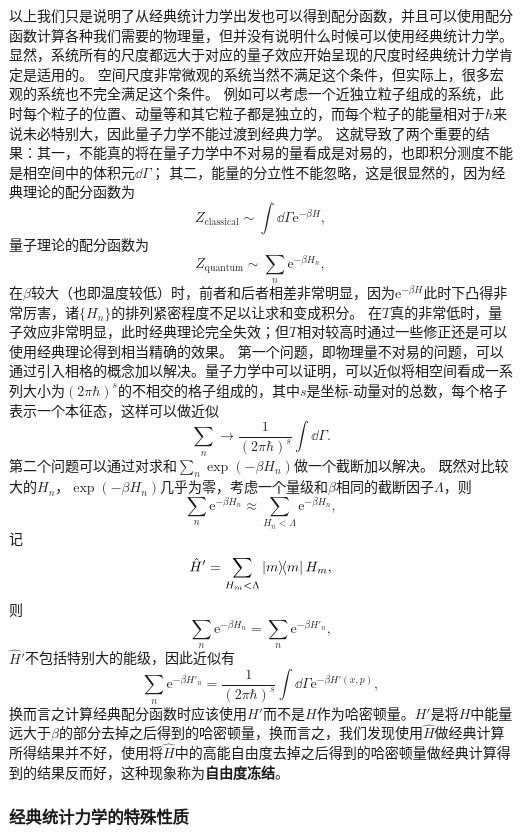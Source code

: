 \documentclass[hyperref, UTF8, a4paper]{ctexart}
\newcommand*{\ee}{\mathrm{e}}
\begin{document}
以上我们只是说明了从经典统计力学出发也可以得到配分函数，并且可以使用配分函数计算各种我们需要的物理量，但并没有说明什么时候可以使用经典统计力学。
显然，系统所有的尺度都远大于对应的量子效应开始呈现的尺度时经典统计力学肯定是适用的。
空间尺度非常微观的系统当然不满足这个条件，但实际上，很多宏观的系统也不完全满足这个条件。
例如可以考虑一个近独立粒子组成的系统，此时每个粒子的位置、动量等和其它粒子都是独立的，而每个粒子的能量相对于$\hbar$来说未必特别大，因此量子力学不能过渡到经典力学。
这就导致了两个重要的结果：其一，不能真的将在量子力学中不对易的量看成是对易的，也即积分测度不能是相空间中的体积元$\dd{\Gamma}$；
其二，能量的分立性不能忽略，这是很显然的，因为经典理论的配分函数为
\[
    Z_\text{classical} \sim \int \dd{\Gamma} \ee^{-\beta H},
\]
量子理论的配分函数为
\[
    Z_\text{quantum} \sim \sum_n \ee^{- \beta H_n},
\]
在$\beta$较大（也即温度较低）时，前者和后者相差非常明显，因为$\ee^{-\beta H}$此时下凸得非常厉害，诸$\{H_n\}$的排列紧密程度不足以让求和变成积分。
在$T$真的非常低时，量子效应非常明显，此时经典理论完全失效；但$T$相对较高时通过一些修正还是可以使用经典理论得到相当精确的效果。
第一个问题，即物理量不对易的问题，可以通过引入相格的概念加以解决。量子力学中可以证明，可以近似将相空间看成一系列大小为$(2\pi \hbar)^s$的不相交的格子组成的，其中$s$是坐标-动量对的总数，每个格子表示一个本征态，这样可以做近似
\[
    \sum_n \longrightarrow \frac{1}{(2\pi \hbar)^s} \int \dd{\Gamma}.
\]
第二个问题可以通过对求和$\sum_n \exp (- \beta H_n)$做一个截断加以解决。
既然对比较大的$H_n$，$\exp(-\beta H_n)$几乎为零，考虑一个量级和$\beta$相同的截断因子$\Lambda$，则
\[
    \sum_n \ee^{-\beta H_n} \approx \sum_{H_n < \Lambda} \ee^{-\beta H_n},
\]
记
\[
    \hat{H}' = \sum_{H_m < \Lambda} \dyad{m} H_m,
\]
则
\[
    \sum_n \ee^{- \beta H_n} = \sum_n \ee^{- \beta H'_n},
\]
$\hat{H}'$不包括特别大的能级，因此近似有
\[
    \sum_n \ee^{-\beta H'_n} = \frac{1}{(2\pi \hbar)^s} \int \dd{\Gamma} \ee^{- \beta H'(x, p)},
\]
换而言之计算经典配分函数时应该使用$H'$而不是$H$作为哈密顿量。$H'$是将$H$中能量远大于$\beta$的部分去掉之后得到的哈密顿量，换而言之，我们发现使用$\hat{H}$做经典计算所得结果并不好，使用将$\hat{H}$中的高能自由度去掉之后得到的哈密顿量做经典计算得到的结果反而好，这种现象称为\textbf{自由度冻结}。

\subsubsection{经典统计力学的特殊性质}
\end{document}
